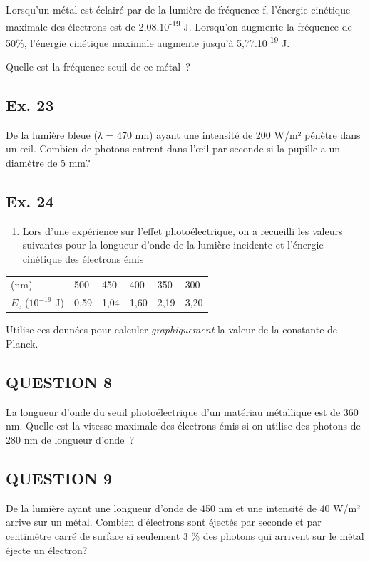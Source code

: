 {Lorsqu'un métal est éclairé par de la lumière de fréquence f, l'énergie
cinétique maximale des électrons est de 2,08.10\textsuperscript{-19} J.
Lorsqu'on augmente la fréquence de 50\%, l'énergie cinétique maximale
augmente jusqu'à 5,77.10\textsuperscript{-19} J.

Quelle est la fréquence seuil de ce métal~?

\subsection{Ex. 23}

De la lumière bleue (λ = 470 nm) ayant une intensité de 200 W/m² pénètre
dans un œil. Combien de photons entrent dans l'œil par seconde si la
pupille a un diamètre de 5 mm?

\subsection{Ex. 24}

\begin{enumerate}
\item  Lors d'une expérience sur l'effet photoélectrique, on a recueilli les
  valeurs suivantes pour la longueur d'onde de la lumière incidente et
  l'énergie cinétique des électrons émis
\end{enumerate}

\begin{longtable}[]{@{}llllll@{}}
(nm) & 500 & 450 & 400 & 350 & 300\tabularnewline
$E_c$ ($10^{-19}$ J) & 0,59 & 1,04 & 1,60 & 2,19 &
3,20\tabularnewline
\end{longtable}

Utilise ces données pour calculer \emph{graphiquement} la
valeur de la constante de Planck.

\subsection{QUESTION 8}

La longueur d'onde du seuil photoélectrique d'un matériau métallique est
de 360 nm. Quelle est la vitesse maximale des électrons émis si on
utilise des photons de 280 nm de longueur d'onde~?

\subsection{QUESTION 9}

De la lumière ayant une longueur d'onde de 450 nm et une intensité de 40
W/m² arrive sur un métal. Combien d'électrons sont éjectés par seconde
et par centimètre carré de surface si seulement 3 \% des photons qui
arrivent sur le métal éjecte un électron?

}

